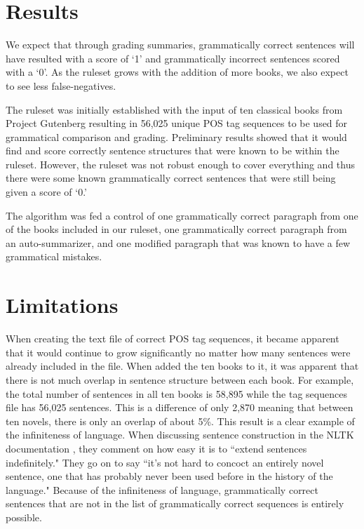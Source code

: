 \documentclass[11pt,a4paper]{article}
\begin{document}
\begin{multicols}{2}
\section{Results}
We expect that through grading summaries, grammatically correct sentences will have resulted with a score of `1' and grammatically incorrect sentences scored with a `0'. As the ruleset grows with the addition of more books, we also expect to see less false-negatives. 

The ruleset was initially established with the input of ten classical books from Project Gutenberg resulting in 56,025 unique POS tag sequences to be used for grammatical comparison and grading. Preliminary results showed that it would find and score correctly sentence structures that were known to be within the ruleset. However, the ruleset was not robust enough to cover everything and thus there were some known grammatically correct sentences that were still being given a score of `0.'

The algorithm was fed a control of one grammatically correct paragraph from one of the books included in our ruleset, one grammatically correct paragraph from an auto-summarizer, and one modified paragraph that was known to have a few grammatical mistakes.


\section{Limitations}
When creating the text file of correct POS tag sequences, it became apparent that it would continue to grow significantly no matter how many sentences were already included in the file. When added the ten books to it, it was apparent that there is not much overlap in sentence structure between each book. For example, the total number of sentences in all ten books is 58,895 while the tag sequences file has 56,025 sentences. This is a difference of only 2,870 meaning that between ten novels, there is only an overlap of about 5\%. This result is a clear example of the infiniteness of language. When discussing sentence construction in the NLTK documentation \cite{nltk}, they comment on how easy it is to ``extend sentences indefinitely." They go on to say ``it's not hard to concoct an entirely novel sentence, one that has probably never been used before in the history of the language." Because of the infiniteness of language, grammatically correct sentences that are not in the list of grammatically correct sequences is entirely possible.


\end{multicols}
\end{document}
